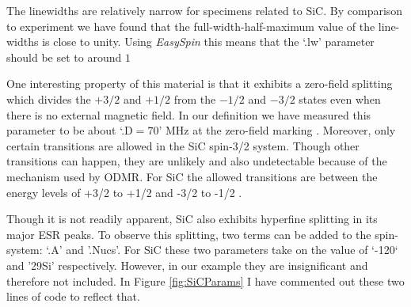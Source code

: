 \documentclass[oneside, noacknowlegments]{BYUPhys}
\begin{document}
The linewidths are relatively narrow for specimens related to SiC. By comparison to experiment we have found that the full-width-half-maximum value of the line-widths is close to unity. Using \textit{EasySpin} this means that the `.lw' parameter should be set to around $1$

One interesting property of this material is that it exhibits a zero-field splitting which divides the $+3/2$ and $+1/2$ from the $-1/2$ and $-3/2$ states even when there is no external magnetic field. In our definition we have measured this parameter to be about `.D$=70$' MHz at the zero-field marking \cite{RefWorks:doc:5892964ee4b0499fa95c5108}. Moreover, only certain transitions are allowed in the SiC spin-3/2 system. Though other transitions can happen, they are unlikely and also undetectable because of the mechanism used by ODMR. For SiC the allowed transitions are between the energy levels of +3/2 to +1/2 and -3/2 to -1/2 \cite{RefWorks:doc:5892964ee4b0499fa95c5108}.

Though it is not readily apparent, SiC also exhibits hyperfine splitting in its major ESR peaks. To observe this splitting, two terms can be added to the spin-system: `.A' and '.Nucs'. For SiC these two parameters take on the value of `-120` and '29Si' respectively. However, in our example they are insignificant and therefore not included. In Figure \ref{fig:SiCParams} I have commented out these two lines of code to reflect that.
\end{document}

